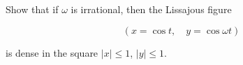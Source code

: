 Show that if $\omega$ is irrational, then the Lissajous figure

$$(x = \cos t, \quad y = \cos \omega t)$$

is dense in the square $|x| \leq 1$, $|y| \leq 1$.

